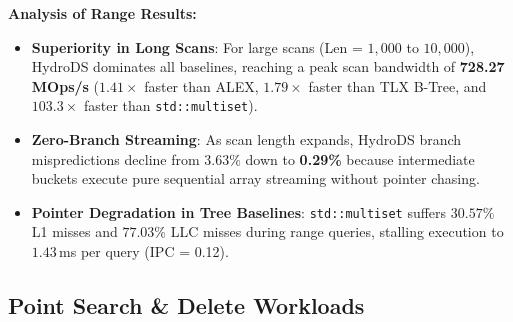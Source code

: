 \documentclass[10pt,twocolumn,letterpaper]{article}
\theoremstyle{definition}
\begin{document}
\noindent\textbf{Analysis of Range Results:}
\begin{itemize}
  \item \textbf{Superiority in Long Scans}: For large scans (Len = $1{,}000$ to $10{,}000$), HydroDS dominates all baselines, reaching a peak scan bandwidth of \textbf{728.27\,MOps/s} ($1.41{\times}$ faster than ALEX, $1.79{\times}$ faster than TLX B-Tree, and $103.3{\times}$ faster than \texttt{std::multiset}).
  \item \textbf{Zero-Branch Streaming}: As scan length expands, HydroDS branch mispredictions decline from $3.63\%$ down to \textbf{0.29\%} because intermediate buckets execute pure sequential array streaming without pointer chasing.
  \item \textbf{Pointer Degradation in Tree Baselines}: \texttt{std::multiset} suffers $30.57\%$ L1 misses and $77.03\%$ LLC misses during range queries, stalling execution to $1.43$\,ms per query (IPC = 0.12).
\end{itemize}

\subsection{Point Search & Delete Workloads}
\end{document}
